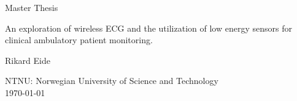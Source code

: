 \begin{titlepage}
    \begin{center}
        \vspace*{1cm}
        
        \huge{Master Thesis}
        
        \vspace{1cm}
        \normalsize
        An exploration of wireless ECG and the utilization of low energy sensors for clinical ambulatory patient monitoring.
        \vspace{1.5cm}
        
        \normalsize
        {Rikard Eide}
        
        \vfill
        
        
        \vspace{0.8cm}
        
        NTNU: Norwegian University of Science and Technology\\
        \today
        
    \end{center}
\end{titlepage}